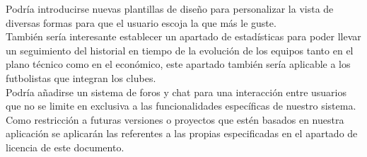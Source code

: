 Podría introducirse nuevas plantillas de diseño para personalizar la vista de
diversas formas para que el usuario escoja la que más le
guste.\\

También sería interesante establecer un apartado de estadísticas para poder
llevar un seguimiento del historial en tiempo de la evolución de los equipos
tanto en el plano técnico como en el económico, este apartado también sería
aplicable a los futbolistas que integran los
clubes.\\

Podría añadirse un sistema de foros y chat para una interacción entre usuarios
que no se limite en exclusiva a las funcionalidades
específicas de nuestro sistema.\\

Como restricción a futuras versiones o proyectos que estén basados en nuestra
aplicación se aplicarán las referentes a las propias especificadas en el
apartado de licencia de este documento.
